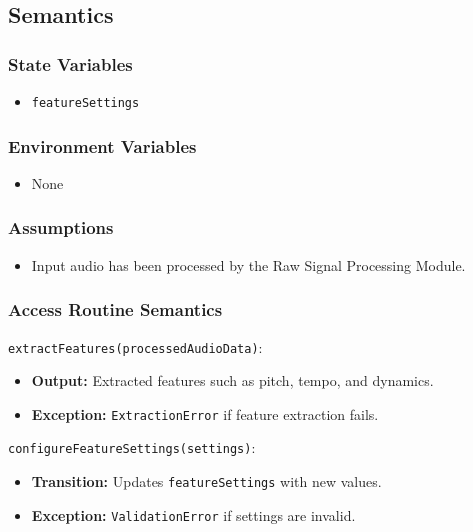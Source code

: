 \documentclass[12pt, titlepage]{article}
\begin{document}
\subsection{Semantics}  

\subsubsection{State Variables}  
\begin{itemize}  
    \item \texttt{featureSettings}  
\end{itemize}  

\subsubsection{Environment Variables}  
\begin{itemize}  
    \item None  
\end{itemize}  

\subsubsection{Assumptions}  
\begin{itemize}  
    \item Input audio has been processed by the Raw Signal Processing Module.  
\end{itemize}  

\subsubsection{Access Routine Semantics}  

\noindent \texttt{extractFeatures(processedAudioData)}:
\begin{itemize}  
    \item \textbf{Output:} Extracted features such as pitch, tempo, and dynamics.  
    \item \textbf{Exception:} \texttt{ExtractionError} if feature extraction fails.  
\end{itemize}  

\noindent \texttt{configureFeatureSettings(settings)}:
\begin{itemize}  
    \item \textbf{Transition:} Updates \texttt{featureSettings} with new values.  
    \item \textbf{Exception:} \texttt{ValidationError} if settings are invalid.  
\end{itemize}  
\end{document}
